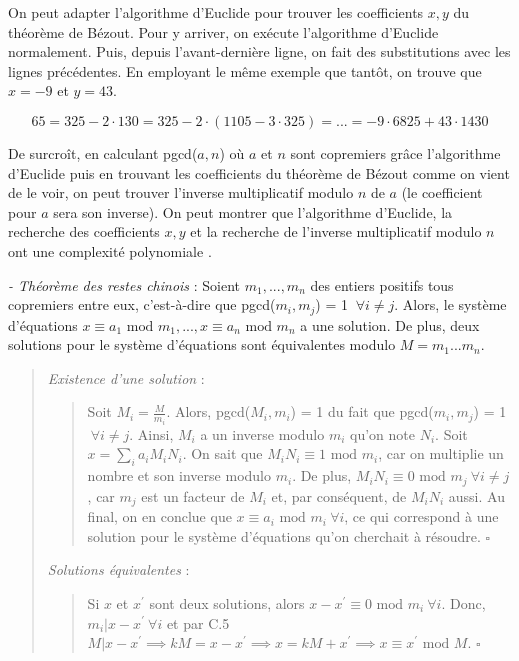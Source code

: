 On peut adapter l'algorithme d'Euclide pour trouver les coefficients $x,y$ du théorème de Bézout. Pour y arriver, on exécute l'algorithme d'Euclide normalement. Puis, depuis l'avant-dernière ligne, on fait des substitutions avec les lignes précédentes. En employant le même exemple que tantôt, on trouve que $x=-9$ et $y =43$.

\begin{equation*}
    65 = 325 - 2 \cdot 130 = 325 - 2 \cdot (1105 - 3 \cdot 325) = ... = -9 \cdot 6825 + 43 \cdot 1430
\end{equation*}

De surcroît, en calculant pgcd($a,n$) où $a$ et $n$ sont copremiers grâce l'algorithme d'Euclide puis en trouvant les coefficients du théorème de Bézout comme on vient de le voir, on peut trouver l'inverse multiplicatif modulo $n$ de $a$ (le coefficient pour $a$ sera son inverse). On peut montrer que l'algorithme d'Euclide, la recherche des coefficients $x,y$ et la recherche de l'inverse multiplicatif modulo $n$ ont une complexité polynomiale \cite{nielsen00}.

\textit{- Théorème des restes chinois} : Soient $m_1, ..., m_n$ des entiers positifs tous copremiers entre eux, c'est-à-dire que pgcd($m_i, m_j$) = 1 $\ \forall i \not= j$. Alors, le système d'équations $x \equiv a_1 \text{ mod } m_1, ..., x \equiv a_n \text{ mod } m_n$ a une solution. De plus, deux solutions pour le système d'équations sont équivalentes modulo $M = m_1...m_n$.

\begin{quote}
    \textit{Existence d'une solution} : 
    
    \begin{quote}
        Soit $M_i = \frac{M}{m_i}$. Alors, pgcd($M_i, m_i$) = 1 du fait que pgcd($m_i, m_j$) = 1 $\ \forall i \not= j$. Ainsi, $M_i$ a un inverse modulo $m_i$ qu'on note $N_i$. Soit $x = \sum_{i}^{}a_iM_iN_i$. On sait que $M_iN_i \equiv 1 \text{ mod } m_i$, car on multiplie un nombre et son inverse modulo $m_i$. De plus, $M_iN_i \equiv 0 \text{ mod } m_j \ \forall i \not= j$, car $m_j$ est un facteur de $M_i$ et, par conséquent, de $M_iN_i$ aussi. Au final, on en conclue que $x \equiv a_i \text{ mod } m_i \ \forall i$, ce qui correspond à une solution pour le système d'équations qu'on cherchait à résoudre. $\square$
    \end{quote}
    
    \textit{Solutions équivalentes} : 

    \begin{quote}
        Si $x$ et $x^{'}$ sont deux solutions, alors $x-x^{'} \equiv 0 \text{ mod } m_i \ \forall i$. Donc, $m_i|x-x^{'} \ \forall i$ et par C.5 $M|x-x^{'} \implies kM = x-x^{'} \implies x = kM + x^{'} \implies x \equiv x^{'} \text{ mod } M$. $\square$
    \end{quote}

\end{quote}

